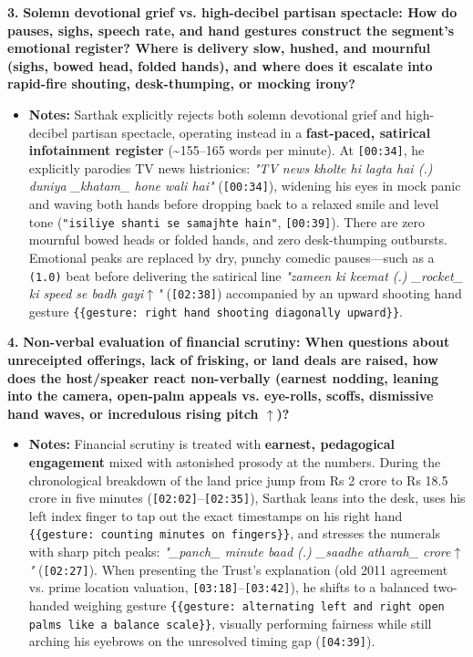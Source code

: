 \documentclass[10pt,a4paper]{article}
\begin{document}
\noindent\textbf{3.} \textbf{Solemn devotional grief vs. high-decibel partisan spectacle: How do pauses, sighs, speech rate, and hand gestures construct the segment's emotional register? Where is delivery slow, hushed, and mournful (sighs, bowed head, folded hands), and where does it escalate into rapid-fire shouting, desk-thumping, or mocking irony?}\par\smallskip
\begin{itemize}
  \item \textbf{Notes:}
Sarthak explicitly rejects both solemn devotional grief and high-decibel partisan spectacle, operating instead in a \textbf{fast-paced, satirical infotainment register} (\textasciitilde{}155--165 words per minute). At \texttt{[00:34]}, he explicitly parodies TV news histrionics: \textit{"TV news kholte hi lagta hai (.) duniya \_khatam\_ hone wali hai"} (\texttt{[00:34]}), widening his eyes in mock panic and waving both hands before dropping back to a relaxed smile and level tone (\texttt{"isiliye shanti se samajhte hain"}, \texttt{[00:39]}). There are zero mournful bowed heads or folded hands, and zero desk-thumping outbursts. Emotional peaks are replaced by dry, punchy comedic pauses---such as a \texttt{(1.0)} beat before delivering the satirical line \textit{"zameen ki keemat (.) \_rocket\_ ki speed se badh gayi$\uparrow$"} (\texttt{[02:38]}) accompanied by an upward shooting hand gesture \texttt{\{\{gesture: right hand shooting diagonally upward\}\}}.\par\smallskip
\end{itemize}

\noindent\textbf{4.} \textbf{Non-verbal evaluation of financial scrutiny: When questions about unreceipted offerings, lack of frisking, or land deals are raised, how does the host/speaker react non-verbally (earnest nodding, leaning into the camera, open-palm appeals vs. eye-rolls, scoffs, dismissive hand waves, or incredulous rising pitch $\uparrow$)?}\par\smallskip
\begin{itemize}
  \item \textbf{Notes:}
Financial scrutiny is treated with \textbf{earnest, pedagogical engagement} mixed with astonished prosody at the numbers. During the chronological breakdown of the land price jump from Rs 2 crore to Rs 18.5 crore in five minutes (\texttt{[02:02]}--\texttt{[02:35]}), Sarthak leans into the desk, uses his left index finger to tap out the exact timestamps on his right hand \texttt{\{\{gesture: counting minutes on fingers\}\}}, and stresses the numerals with sharp pitch peaks: \textit{"\_panch\_ minute baad (.) \_saadhe atharah\_ crore$\uparrow$"} (\texttt{[02:27]}). When presenting the Trust's explanation (old 2011 agreement vs. prime location valuation, \texttt{[03:18]}--\texttt{[03:42]}), he shifts to a balanced two-handed weighing gesture \texttt{\{\{gesture: alternating left and right open palms like a balance scale\}\}}, visually performing fairness while still arching his eyebrows on the unresolved timing gap (\texttt{[04:39]}).\par\smallskip
\end{itemize}
\end{document}
